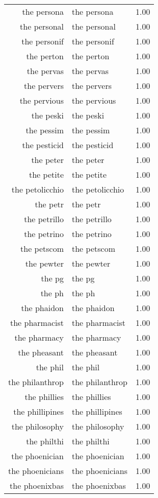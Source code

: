 \begin{table}[ht]
\begin{tabular}{rlr}
  the persona & the persona & 1.00 \\ 
  the personal & the personal & 1.00 \\ 
  the personif & the personif & 1.00 \\ 
  the perton & the perton & 1.00 \\ 
  the pervas & the pervas & 1.00 \\ 
  the pervers & the pervers & 1.00 \\ 
  the pervious & the pervious & 1.00 \\ 
  the peski & the peski & 1.00 \\ 
  the pessim & the pessim & 1.00 \\ 
  the pesticid & the pesticid & 1.00 \\ 
  the peter & the peter & 1.00 \\ 
  the petite & the petite & 1.00 \\ 
  the petolicchio & the petolicchio & 1.00 \\ 
  the petr & the petr & 1.00 \\ 
  the petrillo & the petrillo & 1.00 \\ 
  the petrino & the petrino & 1.00 \\ 
  the petscom & the petscom & 1.00 \\ 
  the pewter & the pewter & 1.00 \\ 
  the pg & the pg & 1.00 \\ 
  the ph & the ph & 1.00 \\ 
  the phaidon & the phaidon & 1.00 \\ 
  the pharmacist & the pharmacist & 1.00 \\ 
  the pharmacy & the pharmacy & 1.00 \\ 
  the pheasant & the pheasant & 1.00 \\ 
  the phil & the phil & 1.00 \\ 
  the philanthrop & the philanthrop & 1.00 \\ 
  the phillies & the phillies & 1.00 \\ 
  the phillipines & the phillipines & 1.00 \\ 
  the philosophy & the philosophy & 1.00 \\ 
  the philthi & the philthi & 1.00 \\ 
  the phoenician & the phoenician & 1.00 \\ 
  the phoenicians & the phoenicians & 1.00 \\ 
  the phoenixbas & the phoenixbas & 1.00 \\ 

\end{tabular}
\end{table}
